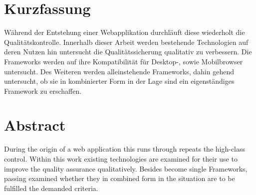 \section*{Kurzfassung}
Während der Entstehung einer Webapplikation durchläuft diese wiederholt die Qualitätskontrolle. Innerhalb dieser Arbeit werden bestehende Technologien auf deren Nutzen hin untersucht die Qualitätssicherung qualitativ zu verbessern. Die \Gls{Framework}s werden auf ihre Kompatibilität für Desktop-, sowie Mobilbrowser untersucht. Des Weiteren werden alleinstehende Frameworks, dahin gehend untersucht, ob sie in kombinierter Form in der Lage sind ein eigenständiges \Gls{Framework} zu erschaffen.


\section*{Abstract}
During the origin of a web application this runs through repeats the high-class control. Within this work existing technologies are examined for their use to improve the quality assurance qualitatively. Besides become single Frameworks, passing examined whether they in combined form in the situation are to be fulfilled the demanded criteria.